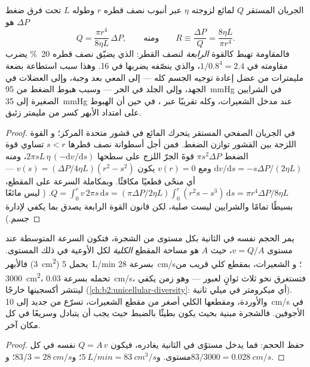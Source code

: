 \begin{theorem}\label{thm:b2:blood-circulation:poiseuille}
الجريان المستقر $Q$ لمائع لزوجته $\eta$ عبر أنبوب
نصف قطره $r$ وطوله $L$ تحت فرق ضغط $\Delta P$
هو
\[
Q = \frac{\pi r^{4}}{8\eta L}\,\Delta P, \qquad \text{ومنه}\qquad
R \equiv \frac{\Delta P}{Q} = \frac{8\eta L}{\pi r^{4}} .
\]
فالمقاومة تهبط كالقوة \emph{الرابعة} لنصف القطر: 
الذي يضيّق نصف قطره \qty{20}{\%} يضرب
مقاومته في $1/0.8^{4} = 2.4$، والذي ينصّفه يضربها في 16. وهذا
سبب استطاعة بضعة مليمترات من عضل  إعادة توجيه
 الجسم كله --- إلى المعي بعد وجبة، وإلى العضلات
في الجهد، وإلى الجلد في الحر --- وسبب هبوط الضغط من
\qty{95}{mmHg} في الشرايين الصغيرة إلى \qty{35}{mmHg} عند
مدخل الشعيرات، وكله تقريبًا عبر
، في حين أن الهبوط على امتداد الأبهر كسر من
مليمتر زئبق.
\end{theorem}
\begin{proof}
في الجريان الصفحي المستقر يتحرك المائع في قشور متحدة المركز؛ و
القوة اللزجة بين القشور توازن الضغط. فمن أجل
أسطوانة نصف قطرها $s < r$ تساوي قوة الضغط $\pi s^{2}\Delta P$
قوةَ الجرّ اللزج على سطحها $2\pi s L\,\eta\,(-\mathrm{d}v/
\mathrm{d}s)$، ومنه $\mathrm{d}v/\mathrm{d}s = -s\Delta P/(2\eta L)$
ومع $v(r) = 0$ يكون $v(s) = (\Delta P/4\eta L)(r^{2} - s^{2})$ --- أي
منحًى قطعيًا مكافئًا. وبمكاملة السرعة على المقطع،
$Q = \int_{0}^{r} v\,2\pi s\,\mathrm{d}s = (\pi\Delta P/2\eta L)
\int_{0}^{r}(r^{2}s - s^{3})\,\mathrm{d}s = \pi r^{4}\Delta P/8\eta
L$. ( ليس مائعًا بسيطًا تمامًا والشرايين ليست صلبة،
لكن قانون القوة الرابعة يصدق بما يكفي لإدارة جسم.)
\end{proof}

\begin{theorem}\label{thm:b2:blood-circulation:continuity}
يمر الحجم نفسه في الثانية بكل مستوى من الشجرة، فتكون
السرعة المتوسطة عند مستوى $v = Q/A$، حيث $A$ هو مساحة المقطع
\emph{الكلية} لكل الأوعية في ذلك المستوى. فالأبهر
(\qty{3}{cm^2}) يحمل \qty{5}{L/min} بسرعة \qty{28}{cm/s}؛ و
الشعيرات، بمقطع كلي قريب من \qty{3000}{cm^2}، تحمله
بسرعة \qty{0.03}{cm/s}، فتستغرق  نحو ثلاث ثوانٍ
لعبور  --- وهو زمن يكفي لينتشر أكسجينها خارجًا
(\cref{ch:b2:unicellular-diversity}: أي ميكرومتر في
ميلي ثانية). والأوردة، ومقطعها الكلي أصغر من مقطع
الشعيرات، تسرّع  من جديد إلى \qty{10}{cm/s} في
الأجوفين. فالشجرة مبنية بحيث يكون  بطيئًا بالضبط حيث
يجب أن يتبادل وسريعًا في كل مكان آخر.
\end{theorem}
\begin{proof}
حفظ الحجم: فما يدخل مستوًى في الثانية يغادره،
فيكون $Q = A\,v$ نفسه في كل مستوى. و$\qty{5}{L/min} =
\qty{83}{cm^3/s}$؛ و$83/3 = \qty{28}{cm/s}$؛ و$83/3000 =
\qty{0.028}{cm/s}$.
\end{proof}


